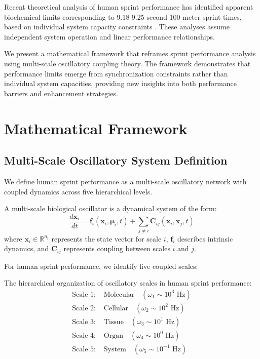 \documentclass[twocolumn]{article}
\begin{document}
Recent theoretical analysis of human sprint performance has identified apparent biochemical limits corresponding to 9.18-9.25 second 100-meter sprint times, based on individual system capacity constraints \citep{sahlin2011creatine,westerblad2002muscle}. These analyses assume independent system operation and linear performance relationships.

We present a mathematical framework that reframes sprint performance analysis using multi-scale oscillatory coupling theory. The framework demonstrates that performance limits emerge from synchronization constraints rather than individual system capacities, providing new insights into both performance barriers and enhancement strategies.

\section{Mathematical Framework}

\subsection{Multi-Scale Oscillatory System Definition}

We define human sprint performance as a multi-scale oscillatory network with coupled dynamics across five hierarchical levels.

\begin{definition}
A multi-scale biological oscillator is a dynamical system of the form:
\begin{equation}
\frac{d\mathbf{x}_i}{dt} = \mathbf{f}_i(\mathbf{x}_i, \boldsymbol{\mu}_i, t) + \sum_{j \neq i} \mathbf{C}_{ij}(\mathbf{x}_i, \mathbf{x}_j, t)
\label{eq:multiscale_oscillator}
\end{equation}
where $\mathbf{x}_i \in \mathbb{R}^{n_i}$ represents the state vector for scale $i$, $\mathbf{f}_i$ describes intrinsic dynamics, and $\mathbf{C}_{ij}$ represents coupling between scales $i$ and $j$.
\end{definition}

For human sprint performance, we identify five coupled scales:

\begin{definition}
The hierarchical organization of oscillatory scales in human sprint performance:
\begin{align}
\text{Scale 1: } &\text{Molecular} \quad (\omega_1 \sim 10^3 \text{ Hz}) \label{eq:scale1} \\
\text{Scale 2: } &\text{Cellular} \quad (\omega_2 \sim 10^2 \text{ Hz}) \label{eq:scale2} \\
\text{Scale 3: } &\text{Tissue} \quad (\omega_3 \sim 10^1 \text{ Hz}) \label{eq:scale3} \\
\text{Scale 4: } &\text{Organ} \quad (\omega_4 \sim 10^0 \text{ Hz}) \label{eq:scale4} \\
\text{Scale 5: } &\text{System} \quad (\omega_5 \sim 10^{-1} \text{ Hz}) \label{eq:scale5}
\end{align}
\end{definition}
\end{document}
